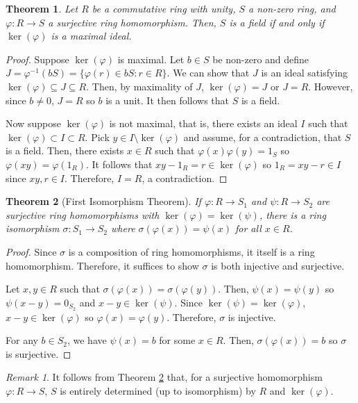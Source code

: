 \documentclass[
    parskip=half,
    toc=flat,
    toc=sectionentrydotfill,
]{scrartcl}  %
\theoremstyle{definition}
\theoremstyle{plain}
\newtheorem{theorem}{Theorem}[definition]
\theoremstyle{remark}
\newtheorem{remark}{Remark}[definition]
\begin{document}
\begin{theorem}
    Let $R$ be a commutative ring with unity, $S$ a non-zero ring, and $\varphi:R\to S$ a
    surjective ring homomorphism.
    Then, $S$ is a field if and only if $\ker(\varphi)$ is a maximal ideal.
\end{theorem}

\begin{proof}
    Suppose $\ker(\varphi)$ is maximal.
    Let $b\in S$ be non-zero and define $J=\varphi^{-1}(bS)=\{\varphi(r)\in bS:r\in R\}$.
    We can show that $J$ is an ideal satisfying $\ker(\varphi)\subseteq J\subseteq R$.
    Then, by maximality of $J$, $\ker(\varphi)=J$ or $J=R$.
    However, since $b\neq 0$, $J=R$ so $b$ is a unit.
    It then follows that $S$ is a field.

    Now suppose $\ker(\varphi)$ is not maximal, that is, there exists an ideal $I$ such that
    $\ker(\varphi)\subset I\subset R$.
    Pick $y\in I\setminus\ker(\varphi)$ and assume, for a contradiction, that $S$ is a field.
    Then, there exists $x\in R$ such that $\varphi(x)\varphi(y)=1_S$ so $\varphi(xy)=\varphi(1_R)$.
    It follows that $xy-1_R=r\in\ker(\varphi)$ so $1_R=xy-r\in I$ since $xy,r\in I$.
    Therefore, $I=R$, a contradiction.
\end{proof}

\begin{theorem}[First Isomorphism Theorem]
    \label{thm:isomorphism}
    If $\varphi:R\to S_1$ and $\psi:R\to S_2$ are surjective ring homomorphisms with
    $\ker(\varphi)=\ker(\psi)$, there is a ring isomorphism $\sigma:S_1\to S_2$ where
    $\sigma(\varphi(x))=\psi(x)$ for all $x\in R$.
\end{theorem}

\begin{proof}
    Since $\sigma$ is a composition of ring homomorphisms, it itself is a ring homomorphism.
    Therefore, it suffices to show $\sigma$ is both injective and surjective.

    Let $x,y\in R$ such that $\sigma(\varphi(x))=\sigma(\varphi(y))$.
    Then, $\psi(x)=\psi(y)$ so $\psi(x-y)=0_{S_2}$ and $x-y\in\ker(\psi)$.
    Since $\ker(\psi)=\ker(\varphi)$, $x-y\in\ker(\varphi)$ so $\varphi(x)=\varphi(y)$.
    Therefore, $\sigma$ is injective.

    For any $b\in S_2$, we have $\psi(x)=b$ for some $x\in R$.
    Then, $\sigma(\varphi(x))=b$ so $\sigma$ is surjective.
\end{proof}

\begin{remark}
    It follows from Theorem \ref{thm:isomorphism} that, for a surjective homomorphism
    $\varphi:R\to S$, $S$ is entirely determined (up to isomorphism) by $R$ and $\ker(\varphi)$.
\end{remark}
\end{document}
